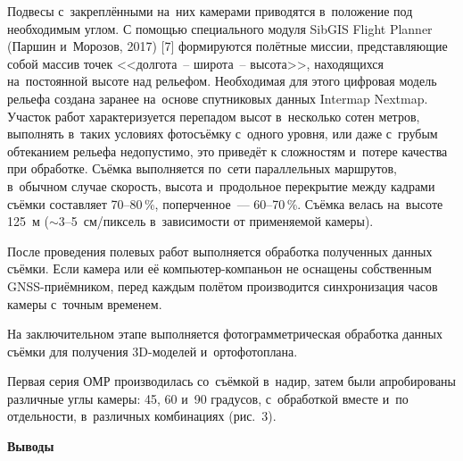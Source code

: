 Подвесы с~закреплёнными на~них камерами приводятся в~положение под необходимым углом.
\clearpage
С помощью специального модуля SibGIS Flight Planner (Паршин и~Морозов, 2017) [7] формируются полётные миссии, представляющие собой массив точек <<долгота~-- широта~-- высота>>, находящихся на~постоянной высоте над рельефом. Необходимая для этого цифровая модель рельефа создана заранее на~основе спутниковых данных Intermap Nextmap. Участок работ характеризуется перепадом высот в~несколько сотен метров, выполнять в~таких условиях фотосъёмку с~одного уровня, или даже с~грубым обтеканием рельефа недопустимо, это приведёт к сложностям и~потере качества при обработке. Съёмка выполняется по~сети параллельных маршрутов, в~обычном случае скорость, высота и~продольное перекрытие между кадрами съёмки составляет 70--80\,\%, поперченное~--- 60--70\,\%. Съёмка велась на~высоте 125~м ($\sim$3--5~см/пиксель в~зависимости от применяемой камеры).

После проведения полевых работ выполняется обработка полученных данных съёмки. Если камера или её компьютер-компаньон не оснащены собственным GNSS-приёмником, перед каждым полётом производится синхронизация часов камеры с~точным временем.

На заключительном этапе выполняется фотограмметрическая обработка данных съёмки для получения 3D-моделей и~ортофотоплана.

Первая серия ОМР производилась со~съёмкой в~надир, затем были апробированы различные углы камеры: 45, 60 и~90 градусов, с~обработкой вместе и~по отдельности, в~различных комбинациях (рис.~3).


\clearpage
\textbf{Выводы}

